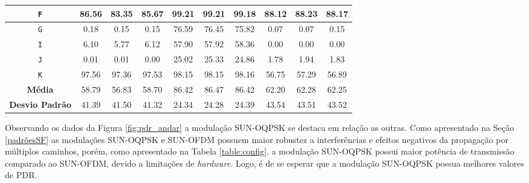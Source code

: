 \begin{table}[ht]
\begin{tabular}{|c|c|c|c|c|c|c|c|c|c|}
            \texttt{F}             & 86.56                                 & 83.35                                   & 85.67                                  & 99.21          & 99.21          & 99.18          & 88.12          & 88.23          & 88.17          \\ \hline
            \texttt{G}             & 0.18                                  & 0.15                                    & 0.15                                   & 76.59          & 76.45          & 75.82          & 0.07           & 0.07           & 0.15           \\ \hline
            \texttt{I}             & 6.10                                  & 5.77                                    & 6.12                                   & 57.90          & 57.92          & 58.36          & 0.00           & 0.00           & 0.00           \\ \hline
            \texttt{J}             & 0.01                                  & 0.01                                    & 0.00                                   & 25.02          & 25.33          & 24.86          & 1.78           & 1.94           & 1.83           \\ \hline
            \texttt{K}             & 97.56                                 & 97.36                                   & 97.53                                  & 98.15          & 98.15          & 98.16          & 56.75          & 57.29          & 56.89          \\ \hline
            \textbf{Média}         & 58.79                                 & 56.83                                   & 58.70                                  & 86.42          & 86.47          & 86.42          & 62.20          & 62.28          & 62.25          \\ \hline
            \textbf{Desvio Padrão} & 41.39                                 & 41.50                                   & 41.32                                  & 24.34          & 24.28          & 24.39          & 43.54          & 43.51          & 43.52          \\ \hline
      \end{tabular}
      \label{table:pdr}
\end{table}

Observando os dados da Figura \ref{fig:pdr_andar} a modulação SUN-OQPSK se destaca em relação as outras. Como apresentado na Seção \ref{padrõesSF} as modulações SUN-OQPSK e SUN-OFDM possuem maior robustez a interferências e efeitos negativos da propagação por múltiplos caminhos, porém, como apresentado na Tabela \ref{table:config}, a modulação SUN-OQPSK possui maior potência de transmissão comparado ao SUN-OFDM, devido a limitações de \emph{hardware}. Logo, é de se esperar que a modulação SUN-OQPSK possua melhores valores de PDR.


